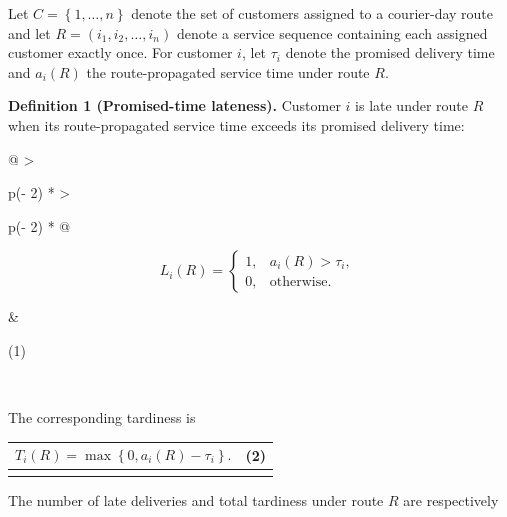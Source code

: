 \documentclass[
]{article}
\newcounter{none} %
\begin{document}
Let \(C = \left\{ 1,\ldots,n \right\}\) denote the set of customers
assigned to a courier-day route and let
\(R = \left( i_{1},i_{2},\ldots,i_{n} \right)\) denote a service
sequence containing each assigned customer exactly once. For customer
\(i\), let \(\tau_{i}\) denote the promised delivery time and
\(a_{i}(R)\) the route-propagated service time under route \(R\).

\textbf{Definition 1 (Promised-time lateness).} Customer \(i\) is late
under route \(R\) when its route-propagated service time exceeds its
promised delivery time:

{\def\LTcaptype{none} %
\begin{longtable}[]{@{}
  >{\raggedright\arraybackslash}p{}
  >{\raggedright\arraybackslash}p{}@{}}
\toprule\noalign{}
\begin{minipage}[b]{\linewidth}\raggedright
\[L_{i}(R) = \left\{ \begin{matrix}
1, & a_{i}(R) > \tau_{i}, \\
0, & \text{otherwise}.
\end{matrix} \right.\ \]
\end{minipage} & \begin{minipage}[b]{\linewidth}\raggedleft
(1)
\end{minipage} \\
\midrule\noalign{}
\endhead
\bottomrule\noalign{}
\endlastfoot
\end{longtable}
}

The corresponding tardiness is

{\def\LTcaptype{none} %
\begin{longtable}[]{@{}
  >{\raggedright\arraybackslash}p{}
  >{\raggedright\arraybackslash}p{}@{}}
\toprule\noalign{}
\begin{minipage}[b]{\linewidth}\raggedright
\[T_{i}(R) = \max\left\{ 0,a_{i}(R) - \tau_{i} \right\}.\]
\end{minipage} & \begin{minipage}[b]{\linewidth}\raggedleft
(2)
\end{minipage} \\
\midrule\noalign{}
\endhead
\bottomrule\noalign{}
\endlastfoot
\end{longtable}
}

The number of late deliveries and total tardiness under route \(R\) are
respectively
\end{document}
